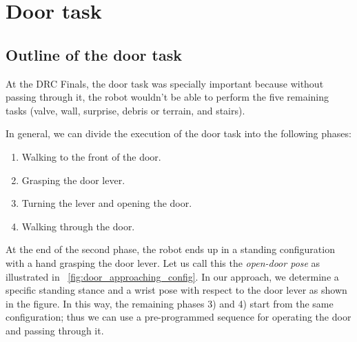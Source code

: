 \section{Door task}
	\label{sub:door}

\subsection{Outline of the door task}
%
At the DRC Finals, the door task was specially important because without passing through it,
the robot wouldn't be able to perform the five remaining tasks
(valve, wall, surprise, debris or terrain, and stairs).
   
In general, we can divide the execution of the door task into the following phases:
%
\begin{enumerate}
	\item Walking to the front of the door.
	\item Grasping the door lever.
	\item Turning the lever and opening the door.
	\item Walking through the door.
\end{enumerate}
%

%

At the end of the second phase, the robot ends up in a standing configuration with a hand grasping
the door lever.
Let us call this the {\it open-door pose} as illustrated in \figurename~\ref{fig:door_approaching_config}.
In our approach, we determine a specific standing stance and a wrist pose with respect to 
the door lever as shown in the figure.
In this way, the remaining phases 3) and 4) start from the same configuration;
thus we can use a pre-programmed sequence for operating the door and passing through it.


